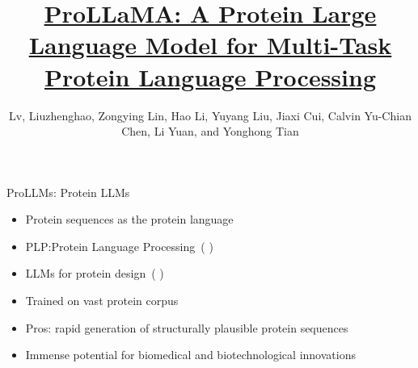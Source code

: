 \documentclass[dvipsnames,
hyperref={
	citecolor=blue,
	colorlinks=true,
	urlcolor=blue,
	linkcolor=,
}
]{beamer}
\title[ProLLaMA]
{\href{https://doi.org/10.48550/arXiv.2402.16445}{ProLLaMA: A Protein Large Language Model for Multi-Task Protein Language Processing}}
\author[Liuzhenghao Lv et al.]{Lv, Liuzhenghao, Zongying Lin, Hao Li, Yuyang Liu, Jiaxi Cui, Calvin Yu-Chian Chen, Li Yuan, and Yonghong Tian}
\date{}%
\let\oldcite\cite
\renewcommand{\cite}[1]{{\color{blue} \oldcite{#1}}}
\begin{document}
\begin{frame}
\titlepage
\end{frame}




\begin{frame}{ProLLMs: Protein LLMs}
	\begin{itemize}\setlength\itemsep{1.5em}
		\item Protein sequences as the protein language
		\item PLP:Protein Language Processing~(\cite{bepler2021learning,ofer2021language})
		\item LLMs for protein design~(\cite{strokach2022deep,ferruz2022controllable})~
		\item Trained on vast protein corpus
		\item Pros: rapid generation of structurally plausible protein sequences
		\item Immense potential for biomedical and biotechnological innovations
	\end{itemize}
\end{frame}

%
\end{document}
